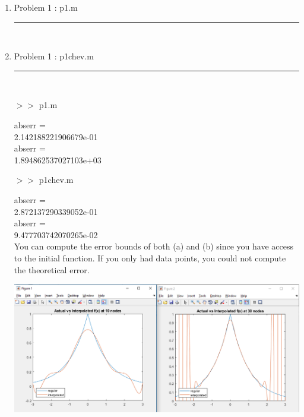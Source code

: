 \documentclass[12pt]{article}
\begin{document}
	\begin{enumerate}
	
	\item[] Problem 1 : p1.m \noindent\rule{\textwidth}{1.0pt} \\
	
	
	\item[] Problem 1 : p1chev.m \noindent\rule{\textwidth}{1.0pt} \\
		
	
	\pagebreak	
	
	$>>$ p1.m
	\begin{framed}
	abserr =\\

     2.142188221906679e-01\\


	abserr =\\

     1.894862537027103e+03\\

	\end{framed}
	
    $>>$ p1chev.m
	\begin{framed}
	
	abserr =\\

     2.872137290339052e-01\\


	abserr =\\

     9.477703742070265e-02\\
     
     You can compute the error bounds of both (a) and (b) since you have access to the initial function. If you only had data points, you could not compute the theoretical error.
	\end{framed}
	
		\begin{center}
			\includegraphics[scale=0.55]{hwg1}
		\end{center} 
		

\end{enumerate}
\end{document}
